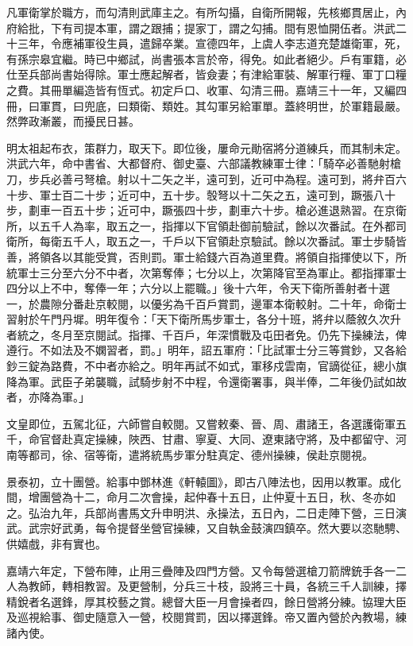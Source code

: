 凡軍衛掌於職方，而勾清則武庫主之。有所勾攝，自衛所開報，先核鄉貫居止，內府給批，下有司提本軍，謂之跟捕；提家丁，謂之勾捕。間有恩恤開伍者。洪武二十三年，令應補軍役生員，遣歸卒業。宣德四年，上虞人李志道充楚雄衛軍，死，有孫宗皋宜繼。時已中鄉試，尚書張本言於帝，得免。如此者絕少。戶有軍籍，必仕至兵部尚書始得除。軍士應起解者，皆僉妻；有津給軍裝、解軍行糧、軍丁口糧之費。其冊單編造皆有恆式。初定戶口、收軍、勾清三冊。嘉靖三十一年，又編四冊，曰軍貫，曰兜底，曰類衛、類姓。其勾軍另給軍單。蓋終明世，於軍籍最嚴。然弊政漸叢，而擾民日甚。

明太祖起布衣，策群力，取天下。即位後，屢命元勛宿將分道練兵，而其制未定。洪武六年，命中書省、大都督府、御史臺、六部議教練軍士律：「騎卒必善馳射槍刀，步兵必善弓弩槍。射以十二矢之半，遠可到，近可中為程。遠可到，將弁百六十步、軍士百二十步；近可中，五十步。彀弩以十二矢之五，遠可到，蹶張八十步，劃車一百五十步；近可中，蹶張四十步，劃車六十步。槍必進退熟習。在京衛所，以五千人為率，取五之一，指揮以下官領赴御前驗試，餘以次番試。在外都司衛所，每衛五千人，取五之一，千戶以下官領赴京驗試。餘以次番試。軍士步騎皆善，將領各以其能受賞，否則罰。軍士給錢六百為道里費。將領自指揮使以下，所統軍士三分至六分不中者，次第奪俸；七分以上，次第降官至為軍止。都指揮軍士四分以上不中，奪俸一年；六分以上罷職。」後十六年，令天下衛所善射者十選一，於農隙分番赴京較閱，以優劣為千百戶賞罰，邊軍本衛較射。二十年，命衛士習射於午門丹墀。明年復令：「天下衛所馬步軍士，各分十班，將弁以蔭敘久次升者統之，冬月至京閱試。指揮、千百戶，年深慣戰及屯田者免。仍先下操練法，俾遵行。不如法及不嫻習者，罰。」明年，詔五軍府：「比試軍士分三等賞鈔，又各給鈔三錠為路費，不中者亦給之。明年再試不如式，軍移戍雲南，官謫從征，總小旗降為軍。武臣子弟襲職，試騎步射不中程，令還衛署事，與半俸，二年後仍試如故者，亦降為軍。」

文皇即位，五駕北征，六師嘗自較閱。又嘗敕秦、晉、周、肅諸王，各選護衛軍五千，命官督赴真定操練，陜西、甘肅、寧夏、大同、遼東諸守將，及中都留守、河南等都司，徐、宿等衛，遣將統馬步軍分駐真定、德州操練，侯赴京閱視。

景泰初，立十團營。給事中鄧林進《軒轅圖》，即古八陣法也，因用以教軍。成化間，增團營為十二，命月二次會操，起仲春十五日，止仲夏十五日，秋、冬亦如之。弘治九年，兵部尚書馬文升申明洪、永操法，五日內，二日走陣下營，三日演武。武宗好武勇，每令提督坐營官操練，又自執金鼓演四鎮卒。然大要以恣馳騁、供嬉戲，非有實也。

嘉靖六年定，下營布陣，止用三疊陣及四門方營。又令每營選槍刀箭牌銃手各一二人為教師，轉相教習。及更營制，分兵三十枝，設將三十員，各統三千人訓練，擇精銳者名選鋒，厚其校藝之賞。總督大臣一月會操者四，餘日營將分練。協理大臣及巡視給事、御史隨意入一營，校閱賞罰，因以擇選鋒。帝又置內營於內教場，練諸內使。

